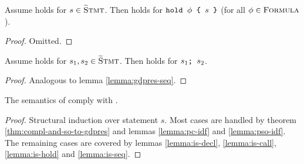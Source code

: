 \begin{lemma}
    \label{lemma:is-hold}
    Assume  holds for $s \in \textup{\textsc{\ensuremath{\widetilde{\text{S}}}tmt}}$.
    Then  holds for $\textup{\texttt{hold $\phi$~\{ $s$ \}}}$ (for all $\phi \in \textup{\textsc{Formula}}$).
\end{lemma}
\begin{proof}
    Omitted.
\end{proof}

\begin{lemma}
    \label{lemma:is-seq}
    Assume  holds for $s_1, s_2 \in \textup{\textsc{\ensuremath{\widetilde{\text{S}}}tmt}}$.
    Then  holds for $\textup{\texttt{{$s_1$};~{$s_2$}}}$.
\end{lemma}
\begin{proof}
    Analogous to lemma \ref{lemma:gdpres-seq}.
\end{proof}

\begin{theorem}
    The semantics of \gvlidf comply with .
\end{theorem}
\begin{proof}
    Structural induction over statement $s$.
    Most cases are handled by theorem \ref{thm:compl-and-so-to-gdpres} and lemmas \ref{lemma:pc-idf} and \ref{lemma:pso-idf}.
    The remaining cases are covered by lemmas 
    \ref{lemma:is-decl},
    \ref{lemma:is-call},
    \ref{lemma:is-hold} and
    \ref{lemma:is-seq}.
\end{proof}
